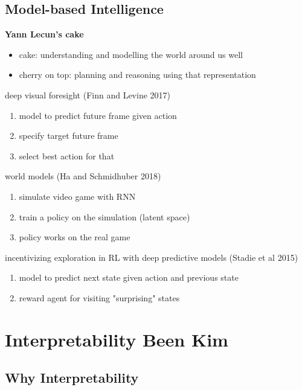 \documentclass[]{article}
\theoremstyle{definition}
\begin{document}
    \subsection{Model-based Intelligence}%
    \label{sub:model_based_intelligence}

    \textbf{Yann Lecun's cake}
    \begin{itemize}
        \item cake: understanding and modelling the world around us well
        \item cherry on top: planning and reasoning using that representation
    \end{itemize}

    deep visual foresight (Finn and Levine 2017)
    \begin{enumerate}
        \item model to predict future frame given action
        \item specify target future frame
        \item select best action for that
    \end{enumerate}
    world models (Ha and Schmidhuber 2018)
    \begin{enumerate}
        \item simulate video game with RNN
        \item train a policy on the simulation (latent space)
        \item policy works on the real game
    \end{enumerate}
    incentivizing exploration in RL with deep predictive models (Stadie et al 2015)
    \begin{enumerate}
        \item model to predict next state given action and previous state
        \item reward agent for visiting "surprising" states
    \end{enumerate}



    \section{Interpretability {\small Been Kim}}%
    \label{sec:interpretability_small_been_kim_}

    \subsection{Why Interpretability}%
    \label{sub:introduction}
\end{document}
